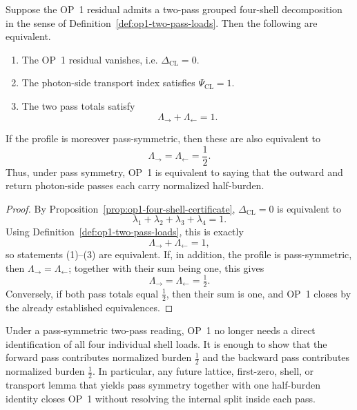 \begin{proposition}
\label{prop:op1-two-pass-half-burden}
Suppose the OP~1 residual admits a two-pass grouped four-shell decomposition in the sense of Definition~\ref{def:op1-two-pass-loads}. Then the following are equivalent.
\begin{enumerate}[leftmargin=2em]
 \item The OP~1 residual vanishes, i.e. \(\Delta_{\mathrm{CL}}=0\).
 \item The photon-side transport index satisfies \(\Psi_{\mathrm{CL}}=1\).
 \item The two pass totals satisfy
 \[
 \Lambda_{\rightarrow}+\Lambda_{\leftarrow}=1.
 \]
\end{enumerate}
If the profile is moreover pass-symmetric, then these are also equivalent to
\[
 \Lambda_{\rightarrow}=\Lambda_{\leftarrow}=\frac12.
\]
Thus, under pass symmetry, OP~1 is equivalent to saying that the outward and return photon-side passes each carry normalized half-burden.
\end{proposition}

\begin{proof}
By Proposition~\ref{prop:op1-four-shell-certificate}, \(\Delta_{\mathrm{CL}}=0\) is equivalent to
\[
 \lambda_1+\lambda_2+\lambda_3+\lambda_4=1.
\]
Using Definition~\ref{def:op1-two-pass-loads}, this is exactly
\[
 \Lambda_{\rightarrow}+\Lambda_{\leftarrow}=1,
\]
so statements (1)--(3) are equivalent. If, in addition, the profile is pass-symmetric, then \(\Lambda_{\rightarrow}=\Lambda_{\leftarrow}\); together with their sum being one, this gives
\[
 \Lambda_{\rightarrow}=\Lambda_{\leftarrow}=\tfrac12.
\]
Conversely, if both pass totals equal \(\tfrac12\), then their sum is one, and OP~1 closes by the already established equivalences.
\end{proof}

\begin{corollary}
\label{cor:op1-two-pass-reduction}
Under a pass-symmetric two-pass reading, OP~1 no longer needs a direct identification of all four individual shell loads. It is enough to show that the forward pass contributes normalized burden \(\tfrac12\) and the backward pass contributes normalized burden \(\tfrac12\). In particular, any future lattice, first-zero, shell, or transport lemma that yields pass symmetry together with one half-burden identity closes OP~1 without resolving the internal split inside each pass.
\end{corollary}

